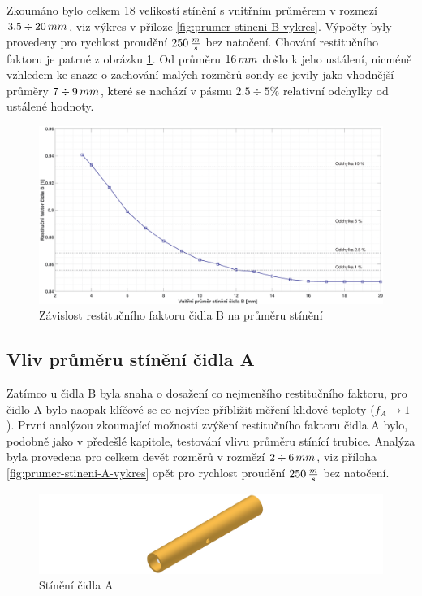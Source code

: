         Zkoumáno bylo celkem 18 velikostí stínění s vnitřním průměrem v rozmezí \linebreak$3.5 \div 20\, mm$, viz výkres v příloze \ref{fig:prumer-stineni-B-vykres}. Výpočty byly provedeny pro rychlost proudění $250 \, \frac{m}{s}$ bez natočení. Chování restitučního faktoru je patrné z obrázku \ref{fig:prumer-stineni-B}. Od průměru $16 \, mm$ došlo k jeho ustálení, nicméně vzhledem ke snaze o zachování malých rozměrů sondy se jevily jako vhodnější průměry $7 \div 9 \, mm$, které se nachází v pásmu $2.5 \div 5 \%$ relativní odchylky od ustálené hodnoty.
        
        \begin{figure}[ht!]
            \centering
            \includegraphics*[width=\textwidth]{400_SIMULACE_KONSTRUKCNICH_UPRAV/Grafy/04_prumer_stineni_B}
            \caption{Závislost restitučního faktoru čidla B na průměru stínění}
            \label{fig:prumer-stineni-B}
        \end{figure}
    
    \newpage
    \subsection{Vliv průměru stínění čidla A} \label{sec:stineni-A}
        Zatímco u čidla B byla snaha o dosažení co nejmenšího restitučního faktoru, pro čidlo A bylo naopak klíčové se co nejvíce příbližit měření klidové teploty ($f_A \rightarrow 1$). První analýzou zkoumající možnosti zvýšení restitučního faktoru čidla A bylo, podobně jako v předešlé kapitole, testování vlivu průměru stínící trubice. Analýza byla provedena pro celkem devět rozměrů v rozmězí $2 \div 6 \, mm$, viz příloha \ref{fig:prumer-stineni-A-vykres} opět pro rychlost proudění $250 \, \frac{m}{s}$ bez natočení.
        
        \begin{figure}[ht!]
            \centering
            \includegraphics[width=\textwidth]{400_SIMULACE_KONSTRUKCNICH_UPRAV/Vykresy_rendery/Stineni_A.png}
            \caption{Stínění čidla A}
            \label{fig:stineni-A}
        \end{figure}

